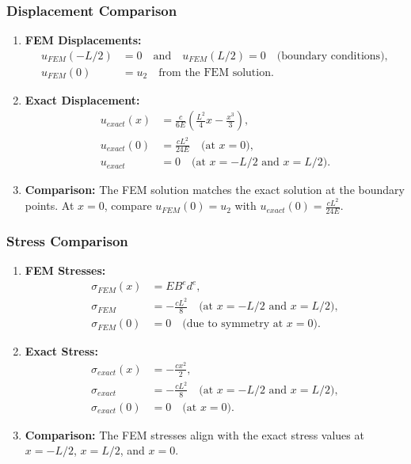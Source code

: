\documentclass{article}
\begin{document}
\subsubsection*{Displacement Comparison}

\begin{enumerate}
    \item \textbf{FEM Displacements:} 
        \begin{align*}
            u_{FEM}(-L/2) &= 0 \quad \text{and} \quad u_{FEM}(L/2) = 0 \quad \text{(boundary conditions)}, \\
            u_{FEM}(0) &= u_2 \quad \text{from the FEM solution}.
        \end{align*}

    \item \textbf{Exact Displacement:}
        \begin{align*}
            u_{exact}(x) &= \frac{c}{6E} \left(\frac{L^2}{4} x - \frac{x^3}{3}\right), \\
            u_{exact}(0) &= \frac{c L^2}{24E} \quad \text{(at } x = 0\text{)}, \\
            u_{exact} &= 0 \quad \text{(at } x = -L/2 \text{ and } x = L/2\text{)}.
        \end{align*}

    \item \textbf{Comparison:} The FEM solution matches the exact solution at the boundary points. At \( x = 0 \), compare \( u_{FEM}(0) = u_2 \) with \( u_{exact}(0) = \frac{c L^2}{24E} \).
\end{enumerate}

\subsubsection*{Stress Comparison}

\begin{enumerate}
    \item \textbf{FEM Stresses:}
        \begin{align*}
            \sigma_{FEM}(x) &= E B^e d^e, \\
            \sigma_{FEM} &= -\frac{c L^2}{8} \quad \text{(at } x = -L/2 \text{ and } x = L/2\text{)}, \\
            \sigma_{FEM}(0) &= 0 \quad \text{(due to symmetry at } x = 0\text{)}.
        \end{align*}

    \item \textbf{Exact Stress:}
        \begin{align*}
            \sigma_{exact}(x) &= -\frac{c x^2}{2}, \\
            \sigma_{exact} &= -\frac{c L^2}{8} \quad \text{(at } x = -L/2 \text{ and } x = L/2\text{)}, \\
            \sigma_{exact}(0) &= 0 \quad \text{(at } x = 0\text{)}.
        \end{align*}

    \item \textbf{Comparison:} The FEM stresses align with the exact stress values at \( x = -L/2 \), \( x = L/2 \), and \( x = 0 \).
\end{enumerate}
\end{document}
